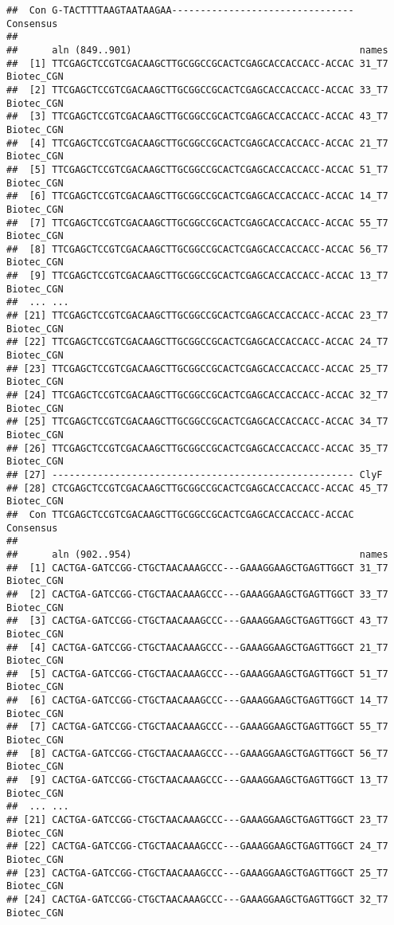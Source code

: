 \documentclass[
]{article}
\begin{document}
\begin{verbatim}
##  Con G-TACTTTTAAGTAATAAGAA-------------------------------- Consensus 
## 
##      aln (849..901)                                        names
##  [1] TTCGAGCTCCGTCGACAAGCTTGCGGCCGCACTCGAGCACCACCACC-ACCAC 31_T7 Biotec_CGN
##  [2] TTCGAGCTCCGTCGACAAGCTTGCGGCCGCACTCGAGCACCACCACC-ACCAC 33_T7 Biotec_CGN
##  [3] TTCGAGCTCCGTCGACAAGCTTGCGGCCGCACTCGAGCACCACCACC-ACCAC 43_T7 Biotec_CGN
##  [4] TTCGAGCTCCGTCGACAAGCTTGCGGCCGCACTCGAGCACCACCACC-ACCAC 21_T7 Biotec_CGN
##  [5] TTCGAGCTCCGTCGACAAGCTTGCGGCCGCACTCGAGCACCACCACC-ACCAC 51_T7 Biotec_CGN
##  [6] TTCGAGCTCCGTCGACAAGCTTGCGGCCGCACTCGAGCACCACCACC-ACCAC 14_T7 Biotec_CGN
##  [7] TTCGAGCTCCGTCGACAAGCTTGCGGCCGCACTCGAGCACCACCACC-ACCAC 55_T7 Biotec_CGN
##  [8] TTCGAGCTCCGTCGACAAGCTTGCGGCCGCACTCGAGCACCACCACC-ACCAC 56_T7 Biotec_CGN
##  [9] TTCGAGCTCCGTCGACAAGCTTGCGGCCGCACTCGAGCACCACCACC-ACCAC 13_T7 Biotec_CGN 
##  ... ...
## [21] TTCGAGCTCCGTCGACAAGCTTGCGGCCGCACTCGAGCACCACCACC-ACCAC 23_T7 Biotec_CGN
## [22] TTCGAGCTCCGTCGACAAGCTTGCGGCCGCACTCGAGCACCACCACC-ACCAC 24_T7 Biotec_CGN
## [23] TTCGAGCTCCGTCGACAAGCTTGCGGCCGCACTCGAGCACCACCACC-ACCAC 25_T7 Biotec_CGN
## [24] TTCGAGCTCCGTCGACAAGCTTGCGGCCGCACTCGAGCACCACCACC-ACCAC 32_T7 Biotec_CGN
## [25] TTCGAGCTCCGTCGACAAGCTTGCGGCCGCACTCGAGCACCACCACC-ACCAC 34_T7 Biotec_CGN
## [26] TTCGAGCTCCGTCGACAAGCTTGCGGCCGCACTCGAGCACCACCACC-ACCAC 35_T7 Biotec_CGN
## [27] ----------------------------------------------------- ClyF
## [28] CTCGAGCTCCGTCGACAAGCTTGCGGCCGCACTCGAGCACCACCACC-ACCAC 45_T7 Biotec_CGN
##  Con TTCGAGCTCCGTCGACAAGCTTGCGGCCGCACTCGAGCACCACCACC-ACCAC Consensus 
## 
##      aln (902..954)                                        names
##  [1] CACTGA-GATCCGG-CTGCTAACAAAGCCC---GAAAGGAAGCTGAGTTGGCT 31_T7 Biotec_CGN
##  [2] CACTGA-GATCCGG-CTGCTAACAAAGCCC---GAAAGGAAGCTGAGTTGGCT 33_T7 Biotec_CGN
##  [3] CACTGA-GATCCGG-CTGCTAACAAAGCCC---GAAAGGAAGCTGAGTTGGCT 43_T7 Biotec_CGN
##  [4] CACTGA-GATCCGG-CTGCTAACAAAGCCC---GAAAGGAAGCTGAGTTGGCT 21_T7 Biotec_CGN
##  [5] CACTGA-GATCCGG-CTGCTAACAAAGCCC---GAAAGGAAGCTGAGTTGGCT 51_T7 Biotec_CGN
##  [6] CACTGA-GATCCGG-CTGCTAACAAAGCCC---GAAAGGAAGCTGAGTTGGCT 14_T7 Biotec_CGN
##  [7] CACTGA-GATCCGG-CTGCTAACAAAGCCC---GAAAGGAAGCTGAGTTGGCT 55_T7 Biotec_CGN
##  [8] CACTGA-GATCCGG-CTGCTAACAAAGCCC---GAAAGGAAGCTGAGTTGGCT 56_T7 Biotec_CGN
##  [9] CACTGA-GATCCGG-CTGCTAACAAAGCCC---GAAAGGAAGCTGAGTTGGCT 13_T7 Biotec_CGN 
##  ... ...
## [21] CACTGA-GATCCGG-CTGCTAACAAAGCCC---GAAAGGAAGCTGAGTTGGCT 23_T7 Biotec_CGN
## [22] CACTGA-GATCCGG-CTGCTAACAAAGCCC---GAAAGGAAGCTGAGTTGGCT 24_T7 Biotec_CGN
## [23] CACTGA-GATCCGG-CTGCTAACAAAGCCC---GAAAGGAAGCTGAGTTGGCT 25_T7 Biotec_CGN
## [24] CACTGA-GATCCGG-CTGCTAACAAAGCCC---GAAAGGAAGCTGAGTTGGCT 32_T7 Biotec_CGN

\end{verbatim}
\end{document}
